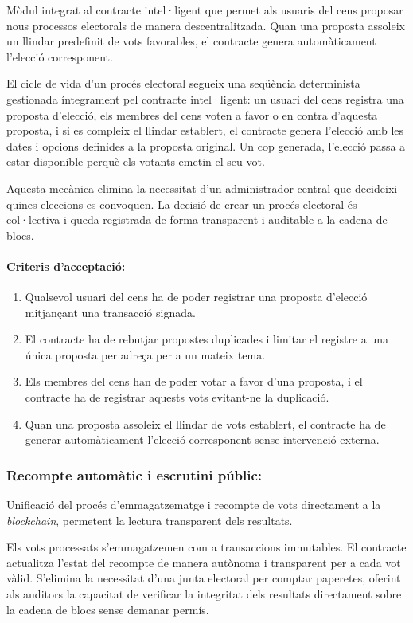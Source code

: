 Mòdul integrat al contracte intel·ligent que permet als usuaris del cens proposar nous processos electorals de manera descentralitzada. Quan una proposta assoleix un llindar predefinit de vots favorables, el contracte genera automàticament l'elecció corresponent.

El cicle de vida d'un procés electoral segueix una seqüència determinista gestionada íntegrament pel contracte intel·ligent: un usuari del cens registra una proposta d'elecció, els membres del cens voten a favor o en contra d'aquesta proposta, i si es compleix el llindar establert, el contracte genera l'elecció amb les dates i opcions definides a la proposta original. Un cop generada, l'elecció passa a estar disponible perquè els votants emetin el seu vot.

Aquesta mecànica elimina la necessitat d'un administrador central que decideixi quines eleccions es convoquen. La decisió de crear un procés electoral és col·lectiva i queda registrada de forma transparent i auditable a la cadena de blocs.

\paragraph{Criteris d'acceptació:}
\begin{enumerate}[label=\roman*.]
    \item Qualsevol usuari del cens ha de poder registrar una proposta d'elecció mitjançant una transacció signada.
    \item El contracte ha de rebutjar propostes duplicades i limitar el registre a una única proposta per adreça per a un mateix tema.
    \item Els membres del cens han de poder votar a favor d'una proposta, i el contracte ha de registrar aquests vots evitant-ne la duplicació.
    \item Quan una proposta assoleix el llindar de vots establert, el contracte ha de generar automàticament l'elecció corresponent sense intervenció externa.
\end{enumerate}

\subsubsection{Recompte automàtic i escrutini públic:}
Unificació del procés d'emmagatzematge i recompte de vots directament a la \textit{blockchain}, permetent la lectura transparent dels resultats.

Els vots processats s'emmagatzemen com a transaccions immutables. El contracte actualitza l'estat del recompte de manera autònoma i transparent per a cada vot vàlid. 
S'elimina la necessitat d'una junta electoral per comptar paperetes, oferint als auditors la capacitat de verificar la integritat dels resultats directament sobre la cadena de blocs sense demanar permís.


